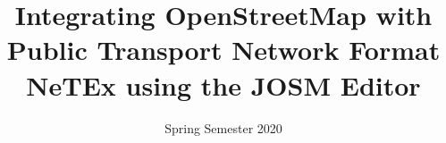 \title  {Integrating OpenStreetMap with Public Transport Network Format NeTEx
	using the JOSM Editor}
\addresses  {\groupname\\\deptname\\\univname}
\date       {Spring Semester 2020}
\subject    {}
\keywords   {}

\maketitle